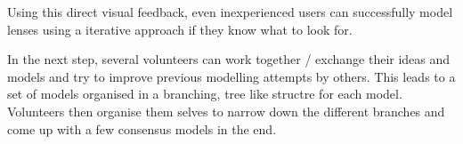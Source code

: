Using this direct visual feedback, even inexperienced users can
successfully model lenses using a iterative approach if they know what
to look for.

In the next step, several volunteers can work together / exchange their ideas and models and try to improve previous modelling attempts by others.
This leads to a set of models organised in a branching, tree like structre for each model.
Volunteers then organise them selves to narrow down the different branches and come up with a few consensus models in the end.







